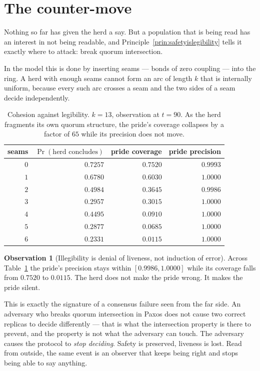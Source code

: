 \documentclass[11pt,a4paper]{article}
\theoremstyle{plain}
\theoremstyle{definition}
\newtheorem{observation}[theorem]{Observation}
\theoremstyle{remark}
\begin{document}
\section{The counter-move}\label{sec:countermove}

Nothing so far has given the herd a say. But a population that is being read
has an interest in not being readable, and Principle~\ref{prin:safetyislegibility}
tells it exactly where to attack: break quorum intersection.

In the model this is done by inserting seams --- bonds of zero coupling ---
into the ring. A herd with enough seams cannot form an arc of length $k$ that
is internally uniform, because every such arc crosses a seam and the two sides
of a seam decide independently.

\begin{table}[t]
\centering
\begin{tabular}{@{}rrrr@{}}
\toprule
seams & $\Pr(\text{herd concludes})$ & pride coverage & pride precision\\
\midrule
$0$ & $0.7257$ & $0.7520$ & $0.9993$\\
$1$ & $0.6780$ & $0.6030$ & $1.0000$\\
$2$ & $0.4984$ & $0.3645$ & $0.9986$\\
$3$ & $0.2957$ & $0.3015$ & $1.0000$\\
$4$ & $0.4495$ & $0.0910$ & $1.0000$\\
$5$ & $0.2877$ & $0.0685$ & $1.0000$\\
$6$ & $0.2331$ & $0.0115$ & $1.0000$\\
\bottomrule
\end{tabular}
\caption{Cohesion against legibility. $k = 13$, observation at $t = 90$. As the
herd fragments its own quorum structure, the pride's coverage collapses by a
factor of $65$ while its precision does not move.}
\label{tab:seams}
\end{table}

\begin{observation}[Illegibility is denial of liveness, not induction of error]
\label{obs:liveness}
Across Table~\ref{tab:seams} the pride's precision stays within
$[0.9986, 1.0000]$ while its coverage falls from $0.7520$ to $0.0115$. The herd
does not make the pride wrong. It makes the pride silent.
\end{observation}

This is exactly the signature of a consensus failure seen from the far side.
An adversary who breaks quorum intersection in Paxos does not cause two correct
replicas to decide differently --- that is what the intersection property is
there to prevent, and the property is not what the adversary can touch. The
adversary causes the protocol to \emph{stop deciding}. Safety is preserved,
liveness is lost. Read from outside, the same event is an observer that keeps
being right and stops being able to say anything.
\end{document}
